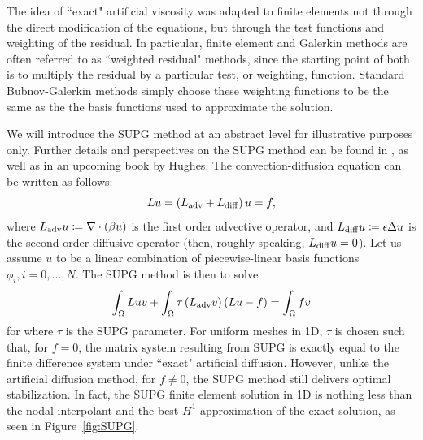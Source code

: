 The idea of ``exact" artificial viscosity was adapted to finite elements not through the direct modification of the equations, but through the test functions and weighting of the residual.  In particular, finite element and Galerkin methods are often referred to as ``weighted residual" methods, since the starting point of both is to multiply the residual by a particular test, or weighting, function.  Standard Bubnov-Galerkin methods simply choose these weighting functions to be the same as the the basis functions used to approximate the solution.  

We will introduce the SUPG method at an abstract level for illustrative purposes only.  Further details and perspectives on the SUPG method can be found in \cite{SUPG}, as well as in an upcoming book by Hughes.  The convection-diffusion equation can be written as follows:
\[
Lu = \left(L_{\rm adv} + L_{\rm diff} \right) u = f,
\]
where $L_{\rm adv}u \coloneqq \div \left(\beta u\right)$ is the first order advective operator, and $L_{\rm diff}u \coloneqq \epsilon \Delta u$ is the second-order diffusive operator (then, roughly speaking, $L_{\rm diff} u = 0$).  Let us assume $u$ to be a linear combination of piecewise-linear basis functions $\phi_i, i = 0,\ldots,N$.  The SUPG method is then to solve
\[
\int_\Omega L u v + \int_\Omega \tau \left(L_{\rm adv}v\right)\left( L u - f\right) = \int_\Omega f v 
\]
for where $\tau$ is the SUPG parameter.  For uniform meshes in 1D, $\tau$ is chosen such that, for $f=0$, the matrix system resulting from SUPG is exactly equal to the finite difference system under ``exact" artificial diffusion.  However, unlike the artificial diffusion method, for $f\neq 0$, the SUPG method still delivers optimal stabilization.  In fact, the SUPG finite element solution in 1D is nothing less than the nodal interpolant and the best $H^1$ approximation of the exact solution, as seen in Figure~\ref{fig:SUPG}.

